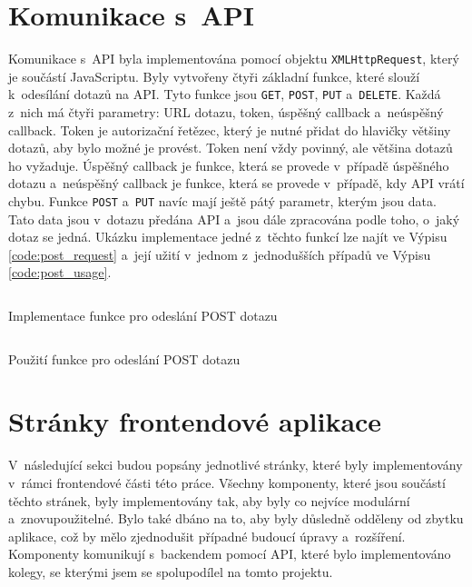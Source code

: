 \section{Komunikace s~API}
Komunikace s~API byla implementována pomocí objektu \texttt{XMLHttpRequest}, který je součástí JavaScriptu. Byly vytvořeny čtyři základní funkce, které slouží k~odesílání dotazů na API. Tyto funkce jsou \texttt{GET}, \texttt{POST}, \texttt{PUT} a~\texttt{DELETE}. Každá z~nich má čtyři parametry: URL dotazu, token, úspěšný callback a~neúspěšný callback. Token je autorizační řetězec, který je nutné přidat do hlavičky většiny dotazů, aby bylo možné je provést. Token není vždy povinný, ale většina dotazů ho vyžaduje. Úspěšný callback je funkce, která se provede v~případě úspěšného dotazu a~neúspěšný callback je funkce, která se provede v~případě, kdy API vrátí chybu. Funkce \texttt{POST} a~\texttt{PUT} navíc mají ještě pátý parametr, kterým jsou data. Tato data jsou v~dotazu předána API a~jsou dále zpracována podle toho, o~jaký dotaz se jedná. Ukázku implementace jedné z~těchto funkcí lze najít ve Výpisu \ref{code:post_request} a~její užití v~jednom z~jednodušších případů ve Výpisu \ref{code:post_usage}.

\begin{listing}[H]
  \inputminted[breaklines]{typescript}{resources/code/post_request.ts}
  \caption{Implementace funkce pro odeslání POST dotazu}
  \label{code:post_request}
\end{listing}

\begin{listing}[H]
  \inputminted[breaklines]{typescript}{resources/code/post_usage.ts}
  \caption{Použití funkce pro odeslání POST dotazu}
  \label{code:post_usage}
\end{listing}

\section{Stránky frontendové aplikace}
V~následující sekci budou popsány jednotlivé stránky, které byly implementovány v~rámci frontendové části této práce. Všechny komponenty, které jsou součástí těchto stránek, byly implementovány tak, aby byly co nejvíce modulární a~znovupoužitelné. Bylo také dbáno na to, aby byly důsledně odděleny od zbytku aplikace, což by mělo zjednodušit případné budoucí úpravy a~rozšíření. Komponenty komunikují s~backendem pomocí API, které bylo implementováno kolegy, se kterými jsem se spolupodílel na tomto projektu.

